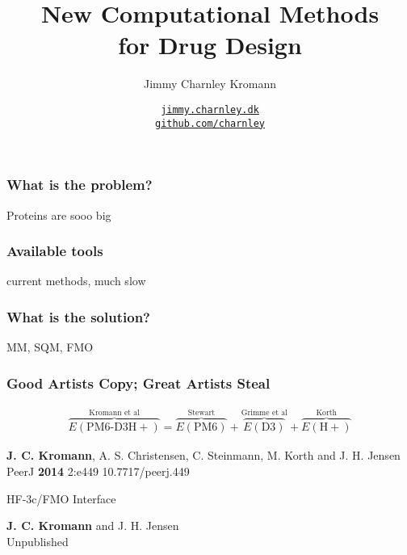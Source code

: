 \documentclass[12pt]{beamer}
\title[]{New Computational Methods\\ for Drug Design}
\institute[, University of Copenhagen]{Department of Chemistry \\ University of Copenhagen}
\author[J. C. Kromann]{Jimmy Charnley Kromann}
\date{
    \href{http://jimmy.charnley.dk}{\tt \scriptsize jimmy.charnley.dk}
    \\[-4pt]
    \href{http://github.com/charnley}{\tt \scriptsize github.com/charnley}
}
\begin{document}
{
\usebackgroundtemplate{}
\frame[plain]{\titlepage}
}


\begin{frame}

    \frametitle{What is the problem?}

    Proteins are sooo big

\end{frame}


\begin{frame}

    \frametitle{Available tools}

    current methods, much slow

\end{frame}


\begin{frame}

    \frametitle{What is the solution?}

    MM, SQM, FMO

\end{frame}


\frame
{
    \frametitle{Good Artists Copy; Great Artists Steal}

    \centering

    \begin{align*}
        { \overbrace{E(\mathrm{PM6\text{-}D3H+})}^\text{Kromann et al} } =
        { \overbrace{ E(\mathrm{PM6}) }^\text{Stewart} } +
        { \overbrace{ E(\mathrm{D3}) }^\text{Grimme et al} } +
        { \overbrace{ E(\mathrm{H+}) }^\text{Korth} }
    \end{align*}


    \bigskip


    {\scriptsize
        {\bf J. C. Kromann}, A. S. Christensen, C. Steinmann, M. Korth and J. H. Jensen\\
        PeerJ
        {\bf 2014}
        2:e449
        {10.7717/peerj.449}
    }


    \bigskip

    \bigskip

    \bigskip

    HF-3c/FMO Interface

    \bigskip

    {\scriptsize
        {\bf J. C. Kromann} and J. H. Jensen\\
        Unpublished
    }

}
\end{document}
